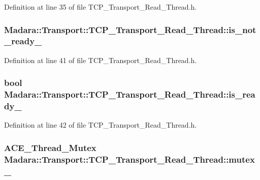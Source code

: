Definition at line 35 of file TCP\_\-Transport\_\-Read\_\-Thread.h.

\hypertarget{classMadara_1_1Transport_1_1TCP__Transport__Read__Thread_af1d33337d547d2057e55cfebbdc97f35}{
\subsubsection[{is\_\-not\_\-ready\_\-}]{ {\bf Madara::Transport::TCP\_\-Transport\_\-Read\_\-Thread::is\_\-not\_\-ready\_\-}}}
\label{d8/d4c/classMadara_1_1Transport_1_1TCP__Transport__Read__Thread_af1d33337d547d2057e55cfebbdc97f35}


Definition at line 41 of file TCP\_\-Transport\_\-Read\_\-Thread.h.

\hypertarget{classMadara_1_1Transport_1_1TCP__Transport__Read__Thread_aa2aab22d67d2ea2c58df58aa55fd506f}{
\subsubsection[{is\_\-ready\_\-}]{\setlength{\rightskip}{0pt plus 5cm}bool {\bf Madara::Transport::TCP\_\-Transport\_\-Read\_\-Thread::is\_\-ready\_\-}}}
\label{d8/d4c/classMadara_1_1Transport_1_1TCP__Transport__Read__Thread_aa2aab22d67d2ea2c58df58aa55fd506f}


Definition at line 42 of file TCP\_\-Transport\_\-Read\_\-Thread.h.

\hypertarget{classMadara_1_1Transport_1_1TCP__Transport__Read__Thread_a3a3a324aa224f19bac886f5ef43c683f}{
\subsubsection[{mutex\_\-}]{\setlength{\rightskip}{0pt plus 5cm}ACE\_\-Thread\_\-Mutex {\bf Madara::Transport::TCP\_\-Transport\_\-Read\_\-Thread::mutex\_\-}}}
\label{d8/d4c/classMadara_1_1Transport_1_1TCP__Transport__Read__Thread_a3a3a324aa224f19bac886f5ef43c683f}


